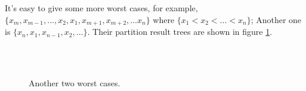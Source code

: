 \documentclass[b5paper]{article}
\begin{document}
It's easy to give some more worst cases, for example, $\{ x_m, x_{m-1}, ..., x_2, x_1, x_{m+1}, x_{m+2}, ... x_n\}$
where $\{ x_1 < x_2 < ... < x_n \}$;
Another one is $\{x_n, x_1, x_{n-1}, x_2, ... \}$. Their partition result trees are shown
in figure \ref{fig:worst-cases-2}.

\begin{figure}[htbp]
   \centering
    \\
    \\
   \caption{Another two worst cases.}
   \label{fig:worst-cases-2}
\end{figure}
\end{document}
